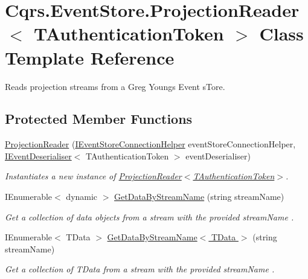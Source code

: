 \hypertarget{classCqrs_1_1EventStore_1_1ProjectionReader}{}\section{Cqrs.\+Event\+Store.\+Projection\+Reader$<$ T\+Authentication\+Token $>$ Class Template Reference}
\label{classCqrs_1_1EventStore_1_1ProjectionReader}


Reads projection streams from a Greg Young\textquotesingle{}s Event s\+Tore.  


\subsection*{Protected Member Functions}
\begin{DoxyCompactItemize}
\item 
\hyperlink{classCqrs_1_1EventStore_1_1ProjectionReader_a87d5f996f75577bb6ae18704c9a590a2_a87d5f996f75577bb6ae18704c9a590a2}{Projection\+Reader} (\hyperlink{interfaceCqrs_1_1EventStore_1_1IEventStoreConnectionHelper}{I\+Event\+Store\+Connection\+Helper} event\+Store\+Connection\+Helper, \hyperlink{interfaceCqrs_1_1EventStore_1_1IEventDeserialiser}{I\+Event\+Deserialiser}$<$ T\+Authentication\+Token $>$ event\+Deserialiser)
\begin{DoxyCompactList}\small\item\em Instantiates a new instance of \hyperlink{classCqrs_1_1EventStore_1_1ProjectionReader_a87d5f996f75577bb6ae18704c9a590a2_a87d5f996f75577bb6ae18704c9a590a2}{Projection\+Reader$<$\+T\+Authentication\+Token$>$}. \end{DoxyCompactList}\item 
I\+Enumerable$<$ dynamic $>$ \hyperlink{classCqrs_1_1EventStore_1_1ProjectionReader_adcc229abde429acfa6b125b3a93a85b4_adcc229abde429acfa6b125b3a93a85b4}{Get\+Data\+By\+Stream\+Name} (string stream\+Name)
\begin{DoxyCompactList}\small\item\em Get a collection of data objects from a stream with the provided {\itshape stream\+Name} . \end{DoxyCompactList}\item 
I\+Enumerable$<$ T\+Data $>$ \hyperlink{classCqrs_1_1EventStore_1_1ProjectionReader_adb256fc2c761a0add40c84fe2c1cb6e8_adb256fc2c761a0add40c84fe2c1cb6e8}{Get\+Data\+By\+Stream\+Name$<$ T\+Data $>$} (string stream\+Name)
\begin{DoxyCompactList}\small\item\em Get a collection of {\itshape T\+Data}  from a stream with the provided {\itshape stream\+Name} . \end{DoxyCompactList}\end{DoxyCompactItemize}
